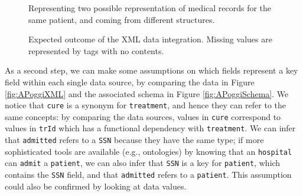 \begin{figure}[!p]
	\begin{minipage}[t]{\textwidth}
		
		\label{fig:ManolescuXML}
	\end{minipage}
	
	\begin{minipage}[t]{\textwidth}
		
		\label{fig:APoggiXML}
	\end{minipage}
	
	\caption{Representing two possible representation of medical records for the same patient, and coming from different structures.}
	\label{fig:XMLIntegration}
\end{figure}
\begin{figure}[!p]
	
	\caption{Expected outcome of the XML data integration. Missing values are represented by tags with no contents.}
	\label{fig:XMLDataMergeAfterAlignment}
\end{figure}
As a second step, we can make some assumptions on which fields  represent a key field within each single data source, by comparing the data in Figure \vref{fig:APoggiXML} and the associated schema in Figure \ref{fig:APoggiSchema}. We notice that \texttt{cure} is a synonym for \texttt{treatment}, and hence they can refer to the same concepts:  by comparing the  data sources,  values in \texttt{cure} correspond to values in \texttt{trId} which has a functional dependency with \texttt{treatment}. We can infer that \texttt{admitted} refers to a \texttt{SSN} because they have the same type; if more sophisticated tools are available (e.g., ontologies) by knowing that an \texttt{hospital} can \texttt{admit} a \texttt{patient},  we can also infer that \texttt{SSN} is a key for \texttt{patient}, which contains the \texttt{SSN} field, and that \texttt{admitted} refers to a \texttt{patient}. This assumption could also be confirmed by looking at data values.





